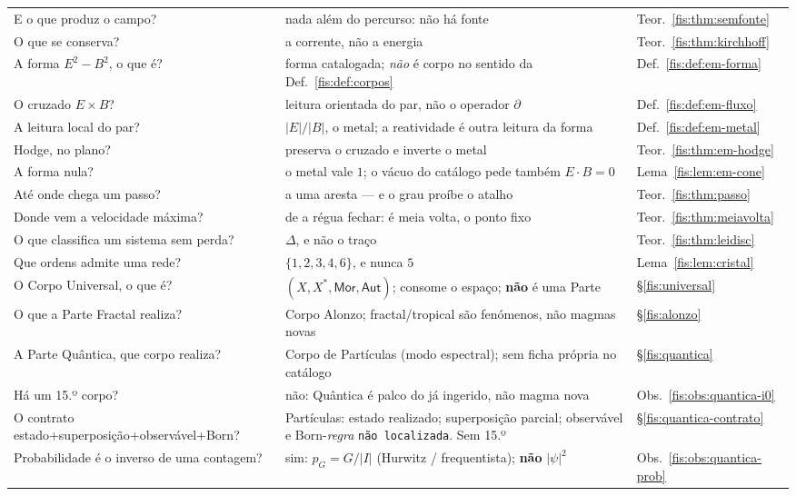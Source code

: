 \documentclass[livro.tex]{subfiles}
\begin{document}
{\begin{longtable}{@{}p{}p{}l@{}}
E o que produz o campo? & nada além do percurso: não há fonte & Teor.~\ref{fis:thm:semfonte} \\
O que se conserva? & a corrente, não a energia & Teor.~\ref{fis:thm:kirchhoff} \\
A forma $E^{2}-B^{2}$, o que é? & forma catalogada; \emph{não} é corpo no sentido da Def.~\ref{fis:def:corpos} & Def.~\ref{fis:def:em-forma} \\
O cruzado $E\times B$? & leitura orientada do par, não o operador $\partial$ & Def.~\ref{fis:def:em-fluxo} \\
A leitura local do par? & $\lvert E\rvert/\lvert B\rvert$, o metal; a reatividade é outra leitura da forma & Def.~\ref{fis:def:em-metal} \\
Hodge, no plano? & preserva o cruzado e inverte o metal & Teor.~\ref{fis:thm:em-hodge} \\
A forma nula? & o metal vale $1$; o vácuo do catálogo pede também $E\cdot B=0$ & Lema~\ref{fis:lem:em-cone} \\
Até onde chega um passo? & a uma aresta --- e o grau proíbe o atalho & Teor.~\ref{fis:thm:passo} \\
Donde vem a velocidade máxima? & de a régua fechar: é meia volta, o ponto fixo & Teor.~\ref{fis:thm:meiavolta} \\
O que classifica um sistema sem perda? & $\Delta$, e não o traço & Teor.~\ref{fis:thm:leidisc} \\
Que ordens admite uma rede? & $\{1,2,3,4,6\}$, e nunca $5$ & Lema~\ref{fis:lem:cristal} \\
O Corpo Universal, o que é? & $(X,X^{*},\mathsf{Mor},\mathsf{Aut})$; consome o espaço; \textbf{não} é uma Parte & §\ref{fis:universal} \\
O que a Parte Fractal realiza? & Corpo Alonzo; fractal/tropical são fenómenos, não magmas novas & §\ref{fis:alonzo} \\
A Parte Quântica, que corpo realiza? & Corpo de Partículas (modo espectral); sem ficha própria no catálogo & §\ref{fis:quantica} \\
Há um 15.º corpo? & não: Quântica é palco do já ingerido, não magma nova & Obs.~\ref{fis:obs:quantica-i0} \\
O contrato estado+superposição+observável+Born? & Partículas: estado realizado; superposição parcial; observável e Born-\emph{regra} \texttt{não localizada}. Sem 15.º & §\ref{fis:quantica-contrato} \\
Probabilidade é o inverso de uma contagem? & sim: $p_G=G/\lvert I\rvert$ (Hurwitz / frequentista); \textbf{não} $\lvert\psi\rvert^{2}$ & Obs.~\ref{fis:obs:quantica-prob} \\

\end{longtable}}
\end{document}
